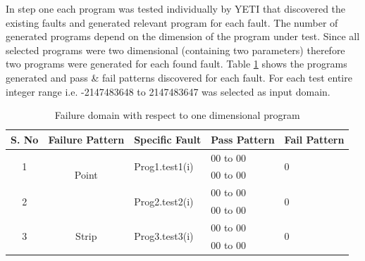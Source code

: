\documentclass{acm_proc_article-sp}
\begin{document}
In step one each program was tested individually by YETI that discovered the existing faults and generated relevant program for each fault. The number of generated programs depend on the dimension of the program under test. Since all selected programs were two dimensional (containing two parameters) therefore two programs were generated for each found fault. Table \ref{tb:failtable} shows the programs generated and pass \& fail patterns discovered for each fault. For each test entire integer range i.e. -2147483648 to 2147483647 was selected as input domain.\\


\begin{table}[t]
\centering

\begin{tabular}{|c|c|l|l|l|}

\hline 

\textbf{S. No}		& \textbf{Failure Pattern}	& \textbf{Specific Fault}	 		& \textbf{Pass Pattern} 			& \textbf{Fail Pattern} 			\\ \hline 


\multirow{2}{*}{1} 	&\multirow{3}{*}{Point}	&\multirow{2}{*}{Prog1.test1(i)}	& 00 to 00				&\multirow{2}{*}{0}	  			\\ \cline{4-4} 
				&					&							&00 to 00				&	                           			\\ \cline{3-5} \hline
\multirow{2}{*}{2} 	&\multirow{3}{*}{Block}	&\multirow{2}{*}{Prog2.test2(i)}	&00 to 00				&\multirow{2}{*}{0}	  			\\ \cline{4-4} 
				&					&							&00 to 00				&	                           			\\ \cline{3-5} \hline
\multirow{2}{*}{3} 	&\multirow{3}{*}{Strip}	&\multirow{2}{*}{Prog3.test3(i)}	&00 to 00				&\multirow{2}{*}{0}	  			\\ \cline{4-4} 
				&					&							&00 to 00				&	                           			\\ \cline{3-5} \hline
\end{tabular}
\caption{Failure domain with respect to one dimensional program}
\label{tb:failtable}
\end{table}
\end{document}
